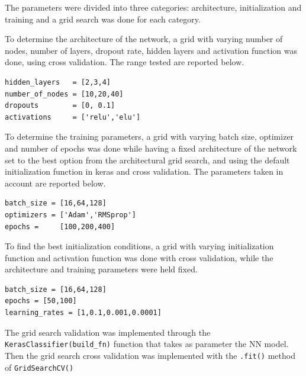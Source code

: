 \documentclass[prl,twocolumn]{revtex4-1}
\begin{document}
The parameters were divided into three categories: architecture, initialization and training and a grid search was done for each category.

To determine the architecture of the network, a grid with varying number of nodes, number of layers, dropout rate, hidden layers and activation function was done, using cross validation. The range tested are reported below.

\begin{lstlisting}[style=python]
hidden_layers   = [2,3,4]
number_of_nodes = [10,20,40]
dropouts        = [0, 0.1]
activations     = ['relu','elu']
\end{lstlisting}

To determine the training parameters, a grid with varying batch size, optimizer and number of epochs was done while having a fixed architecture of the network set to the best option from the architectural grid search, and using the default initialization function in keras and cross validation. The parameters taken in account are reported below.
\begin{lstlisting}[style=python]
batch_size = [16,64,128]
optimizers = ['Adam','RMSprop']
epochs =     [100,200,400]
\end{lstlisting}
To find the best initialization conditions, a grid with varying initialization function and activation function was done with cross validation, while the architecture and training parameters were held fixed.
\begin{lstlisting}[style=python]
batch_size = [16,64,128]
epochs = [50,100]
learning_rates = [1,0.1,0.001,0.0001]
\end{lstlisting}

The grid search validation was implemented through the \texttt{KerasClassifier(build\_fn)} function that takes as parameter the NN model. Then the grid search cross validation was implemented with the \texttt{.fit()} method of \texttt{GridSearchCV()}



\end{document}
